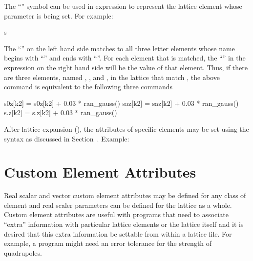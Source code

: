 {{{{{The ``\vn{\%}'' symbol can be used in expression to represent the lattice element whose parameter is
being set. For example:
\begin{example}
  s%
\end{example}
The ``'' on the left hand side matches to all three letter elements whose name begins with
``'' and ends with ``''. For each element that is matched, the ``\vn{\%[k2]}'' in the
expression on the right hand side will be the  value of that element. Thus, if there are three
elements, named , , and , in the lattice that match , the above command
is equivalent to the following three commands
\begin{example}
  s0z[k2] = s0z[k2] + 0.03 * ran_gauss()
  saz[k2] = saz[k2] + 0.03 * ran_gauss()
  s.z[k2] = s.z[k2] + 0.03 * ran_gauss()
\end{example}

After lattice expansion (), the attributes of specific elements may be set using the
syntax as discussed in Section~. Example:

\section{Custom Element Attributes}
\label{s:cust.att}

Real scalar and vector custom element attributes may be defined for any class of element and real
scaler parameters can be defined for the lattice as a whole.  Custom element attributes are useful
with programs that need to associate ``extra'' information with particular lattice elements or the
lattice itself and it is desired that this extra information be settable from within a lattice
file. For example, a program might need an error tolerance for the strength of quadrupoles.

}}}}}
